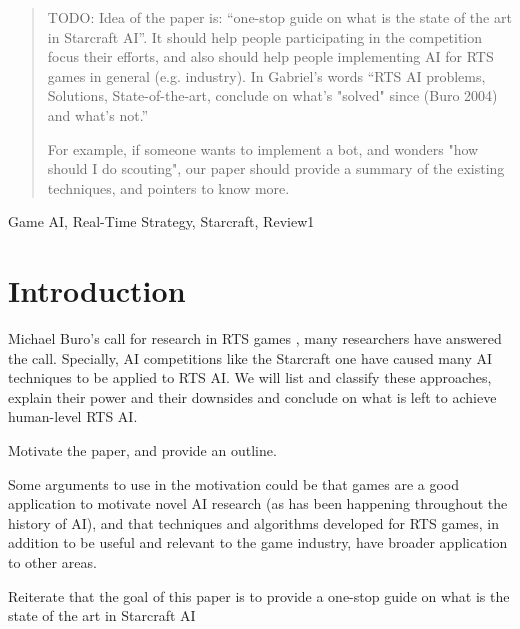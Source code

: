 \documentclass[journal]{IEEEtran}
\begin{document}
\begin{abstract}
TODO: Idea of the paper is: ``one-stop guide on what is the
state of the art in Starcraft AI''. It should help people participating in the competition focus
their efforts, and also should help people implementing AI for RTS games in
general (e.g. industry).  In Gabriel's words ``RTS AI problems, Solutions, State-of-the-art, conclude on what's "solved" since (Buro 2004) and what's not.'' 

For example, if someone wants to implement a bot, and wonders "how should I do scouting", our paper should provide a summary of the existing techniques, and pointers to know more. 
\end{abstract}

\begin{IEEEkeywords}
Game AI, Real-Time Strategy, Starcraft, Review1

\end{IEEEkeywords}

%
\IEEEpeerreviewmaketitle

\section{Introduction}\label{sec:intro}
 Michael Buro's call for research in RTS games \cite{Buro03rts}, many researchers have answered the call. Specially, AI competitions like the Starcraft one have caused many AI techniques to be
applied to RTS AI. We will list and classify these approaches, explain their 
power and their downsides and conclude on what is left to achieve human-level 
RTS AI.

{\color{blue}
Motivate the paper, and provide an outline.

Some arguments to use in the motivation could be that games are a good application to motivate novel AI research (as has been happening throughout the history of AI), and that techniques and algorithms developed for RTS games, in addition to be useful and relevant to the game industry, have broader application to other areas.

Reiterate that the goal of this paper is to provide a one-stop guide on what is the
state of the art in Starcraft AI
}
\end{document}
